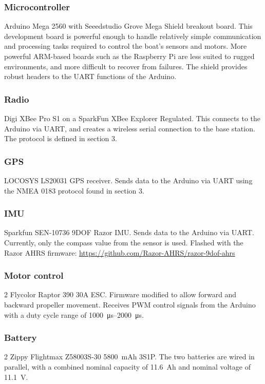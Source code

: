 \documentclass[a4paper]{IEEEtran}
\begin{document}
\subsubsection{Microcontroller}
Arduino Mega 2560 with Seeedstudio Grove Mega Shield breakout board. This development board is powerful enough to handle relatively simple communication and processing tasks required to control the boat's sensors and motors. More powerful ARM-based boards such as the Raspberry Pi are less suited to rugged environments, and more difficult to recover from failures. The shield provides robust headers to the UART functions of the Arduino.

\subsubsection{Radio}
Digi XBee Pro S1 on a SparkFun XBee Explorer Regulated. This connects to the Arduino via UART, and creates a wireless serial connection to the base station. The protocol is defined in section 3.

\subsubsection{GPS}
LOCOSYS LS20031 GPS receiver. Sends data to the Arduino via UART using the NMEA 0183 protocol found in section 3. 

\subsubsection{IMU}
Sparkfun SEN-10736 9DOF Razor IMU. Sends data to the Arduino via UART. Currently, only the compass value from the sensor is used. Flashed with the Razor AHRS firmware: \url{https://github.com/Razor-AHRS/razor-9dof-ahrs}

\subsubsection{Motor control}
2 Flycolor Raptor 390 30A ESC. Firmware modified to allow forward and backward propeller movement. Receives PWM control signals from the Arduino with a duty cycle range of \SIrange{1000}{2000}{\micro\second}.

\subsubsection{Battery}
2 Zippy Flightmax Z58003S-30 \SI{5800}{mAh} 3S1P. The two batteries are wired in parallel, with a combined nominal capacity of \SI{11.6}{Ah} and nominal voltage of \SI{11.1}{V}.
\end{document}

